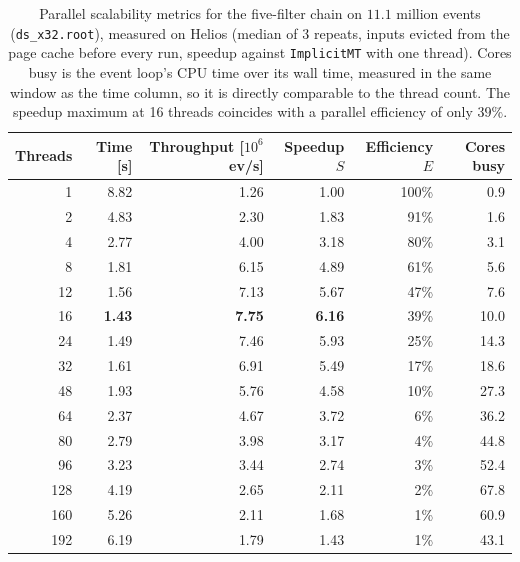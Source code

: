 \begin{table}[htbp]
\centering
\caption{Parallel scalability metrics for the five-filter chain on $11.1$ million events (\texttt{ds\_x32.root}), measured on Helios (median of 3 repeats, inputs evicted from the page cache before every run, speedup against \texttt{ImplicitMT} with one thread). Cores busy is the event loop's CPU time over its wall time, measured in the same window as the time column, so it is directly comparable to the thread count. The speedup maximum at 16 threads coincides with a parallel efficiency of only $39\%$.}
\label{tab:scalability-chain}
\begin{tabular}{rrrrrr}
\toprule
Threads & Time [s] & Throughput [$10^6$ ev/s] & Speedup $S$ & Efficiency $E$ & Cores busy \\
\midrule
 1 & 8.82 & 1.26 & 1.00 & 100\% & 0.9 \\
 2 & 4.83 & 2.30 & 1.83 & 91\% & 1.6 \\
 4 & 2.77 & 4.00 & 3.18 & 80\% & 3.1 \\
 8 & 1.81 & 6.15 & 4.89 & 61\% & 5.6 \\
12 & 1.56 & 7.13 & 5.67 & 47\% & 7.6 \\
16 & \textbf{1.43} & \textbf{7.75} & \textbf{6.16} & 39\% & 10.0 \\
24 & 1.49 & 7.46 & 5.93 & 25\% & 14.3 \\
32 & 1.61 & 6.91 & 5.49 & 17\% & 18.6 \\
48 & 1.93 & 5.76 & 4.58 & 10\% & 27.3 \\
64 & 2.37 & 4.67 & 3.72 & 6\% & 36.2 \\
80 & 2.79 & 3.98 & 3.17 & 4\% & 44.8 \\
96 & 3.23 & 3.44 & 2.74 & 3\% & 52.4 \\
128 & 4.19 & 2.65 & 2.11 & 2\% & 67.8 \\
160 & 5.26 & 2.11 & 1.68 & 1\% & 60.9 \\
192 & 6.19 & 1.79 & 1.43 & 1\% & 43.1 \\
\bottomrule
\end{tabular}
\end{table}
